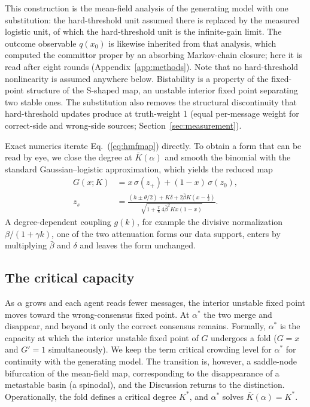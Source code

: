 \documentclass{ieeeaccess}
\newcommand{\astar}{\alpha^{*}}
\begin{document}
This construction is the mean-field analysis of the generating model
\cite{SciRepCrowding} with one substitution: the hard-threshold unit
assumed there is replaced by the measured logistic unit, of which the
hard-threshold unit is the infinite-gain limit. The outcome observable
$q(x_0)$ is likewise inherited from that analysis, which computed the
committor proper by an absorbing Markov-chain closure; here it is read
after eight rounds (Appendix~\ref{app:methods}). Note that no hard-threshold nonlinearity is
assumed anywhere below. Bistability is a property of the fixed-point
structure of the S-shaped map, an unstable interior fixed point separating
two stable ones. The substitution also removes the structural
discontinuity that hard-threshold updates produce at truth-weight 1 (equal
per-message weight for correct-side and wrong-side sources;
Section~\ref{sec:measurement}).

Exact numerics iterate Eq.~(\ref{eq:hmfmap}) directly. To obtain a form
that can be read by eye, we close the degree at $\bar K(\alpha)$ and smooth
the binomial with the standard Gaussian--logistic approximation, which
yields the reduced map
\begin{equation}
\begin{split}
G(x;K) &= x\,\sigma(z_+) + (1-x)\,\sigma(z_0), \\
z_s &= \frac{(h \pm \theta/2) + K\delta + 2\bar\beta K (x - \tfrac12)}
{\sqrt{1 + \tfrac{\pi}{8}\, 4\bar\beta^2 K x(1-x)}}.
\end{split}
\end{equation}
A degree-dependent coupling $g(k)$, for example the divisive normalization
$\beta/(1+\gamma k)$, one of the two attenuation forms our data support,
enters by multiplying $\bar\beta$ and $\delta$ and leaves the form
unchanged.

\subsection{The critical capacity}\label{sec:critical}

As $\alpha$ grows and each agent reads fewer messages, the interior
unstable fixed point moves toward the wrong-consensus fixed point. At
$\astar$ the two merge and disappear, and beyond it only the correct
consensus remains. Formally, $\astar$ is the capacity at which the interior
unstable fixed point of $G$ undergoes a fold ($G = x$ and $G' = 1$
simultaneously). We keep the term critical crowding level for $\astar$ for
continuity with the generating model. The transition is, however, a
saddle-node bifurcation of the mean-field map, corresponding to the
disappearance of a metastable basin (a spinodal), and the Discussion
returns to the distinction. Operationally, the fold defines a critical
degree $K^*$, and $\astar$ solves $\bar K(\alpha) = K^*$.
\end{document}
